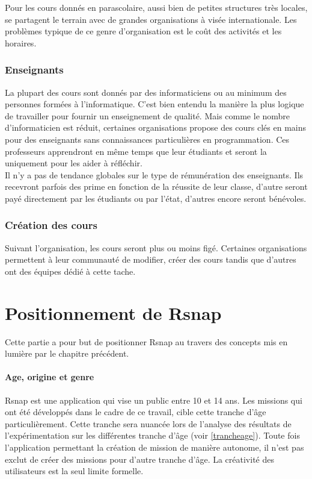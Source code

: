 Pour les cours donnés en parascolaire, aussi bien de petites structures très locales, se partagent le terrain avec de grandes organisations à visée internationale. Les problèmes typique de ce genre d'organisation est le coût des activités et les horaires.

\subsubsection{Enseignants}
La plupart des cours sont donnés par des informaticiens ou au minimum des personnes formées à l'informatique. C'est bien entendu la manière la plus logique de travailler pour fournir un enseignement de qualité. Mais comme le nombre d'informaticien est réduit, certaines organisations propose des cours clés en mains pour des enseignants sans connaissances particulières en programmation. Ces professeurs apprendront en même temps que leur étudiants et seront la uniquement pour les aider à réfléchir.\\

Il n'y a pas de tendance globales sur le type de rémunération des enseignants. Ils recevront parfois des prime en fonction de la réussite de leur classe, d'autre seront payé directement par les étudiants ou par l'état, d'autres encore seront bénévoles.

\subsubsection{Création des cours}
Suivant l'organisation, les cours seront plus ou moins figé. Certaines organisations permettent à leur communauté de modifier, créer des cours tandis que d'autres ont des équipes dédié à cette tache.


\section{Positionnement de Rsnap}
Cette partie a pour but de positionner Rsnap au travers des concepts mis en lumière par le chapitre précédent.

\paragraph{Age, origine et genre} Rsnap est une application qui vise un public entre 10 et 14 ans. Les missions qui ont été développés dans le cadre de ce travail, cible cette tranche d'âge particulièrement. Cette tranche sera nuancée lors de l'analyse des résultats de l'expérimentation sur les différentes tranche d'âge (voir \ref{trancheage}). %
Toute fois l'application permettant la création de mission de manière autonome, il n'est pas exclut de créer des missions pour d'autre tranche d'âge. La créativité des utilisateurs est la seul limite formelle.\\


